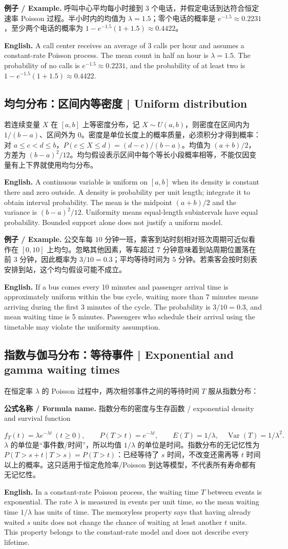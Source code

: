 \documentclass[UTF8,11pt,a4paper]{ctexart}
\newcommand{\EN}[1]{\par\noindent\textbf{English.} #1\par}
\newcommand{\FORMULA}[2]{\par\noindent\textbf{公式名称 / Formula name.} #1 / #2\par}
\newcommand{\EX}[2]{\par\noindent\textbf{例子 / Example.} #1\par\EN{#2}}
\begin{document}
\EX{呼叫中心平均每小时接到 $3$ 个电话，并假定电话到达符合恒定速率 Poisson 过程。半小时内的均值为 $\lambda=1.5$；零个电话的概率是 $e^{-1.5}\approx0.2231$，至少两个电话的概率为 $1-e^{-1.5}(1+1.5)\approx0.4422$。}{A call center receives an average of 3 calls per hour and assumes a constant-rate Poisson process. The mean count in half an hour is $\lambda=1.5$. The probability of no calls is $e^{-1.5}\approx0.2231$, and the probability of at least two is $1-e^{-1.5}(1+1.5)\approx0.4422$.}

\subsection{均匀分布：区间内等密度 | Uniform distribution}
若连续变量 $X$ 在 $[a,b]$ 上等密度分布，记 $X\sim U(a,b)$，则密度在区间内为 $1/(b-a)$、区间外为 $0$。密度是单位长度上的概率质量，必须积分才得到概率：对 $a\le c<d\le b$，$P(c\le X\le d)=(d-c)/(b-a)$。均值为 $(a+b)/2$，方差为 $(b-a)^2/12$。均匀假设表示区间中每个等长小段概率相等，不能仅因变量有上下界就使用均匀分布。
\EN{A continuous variable is uniform on $[a,b]$ when its density is constant there and zero outside. A density is probability per unit length; integrate it to obtain interval probability. The mean is the midpoint $(a+b)/2$ and the variance is $(b-a)^2/12$. Uniformity means equal-length subintervals have equal probability. Bounded support alone does not justify a uniform model.}

\EX{公交车每 $10$ 分钟一班，乘客到站时刻相对班次周期可近似看作在 $[0,10]$ 上均匀。忽略其他因素，等车超过 $7$ 分钟意味着到站周期位置落在前 $3$ 分钟，因此概率为 $3/10=0.3$；平均等待时间为 $5$ 分钟。若乘客会按时刻表安排到站，这个均匀假设可能不成立。}{If a bus comes every 10 minutes and passenger arrival time is approximately uniform within the bus cycle, waiting more than 7 minutes means arriving during the first 3 minutes of the cycle. The probability is $3/10=0.3$, and mean waiting time is 5 minutes. Passengers who schedule their arrival using the timetable may violate the uniformity assumption.}

\subsection{指数与伽马分布：等待事件 | Exponential and gamma waiting times}
在恒定率 $\lambda$ 的 Poisson 过程中，两次相邻事件之间的等待时间 $T$ 服从指数分布：
\FORMULA{指数分布的密度与生存函数}{exponential density and survival function}
\[
f_T(t)=\lambda e^{-\lambda t}\ (t\ge0),\qquad P(T>t)=e^{-\lambda t},
\qquad E(T)=1/\lambda,\quad \operatorname{Var}(T)=1/\lambda^2.
\]
$\lambda$ 的单位是“事件数/时间”，所以均值 $1/\lambda$ 的单位是时间。指数分布的无记忆性为 $P(T>s+t\mid T>s)=P(T>t)$：已经等待了 $s$ 时间，不改变还需再等 $t$ 时间以上的概率。这只适用于恒定危险率/Poisson 到达等模型，不代表所有寿命都有无记忆性。
\EN{In a constant-rate Poisson process, the waiting time $T$ between events is exponential. The rate $\lambda$ is measured in events per unit time, so the mean waiting time $1/\lambda$ has units of time. The memoryless property says that having already waited $s$ units does not change the chance of waiting at least another $t$ units. This property belongs to the constant-rate model and does not describe every lifetime.}
\end{document}
